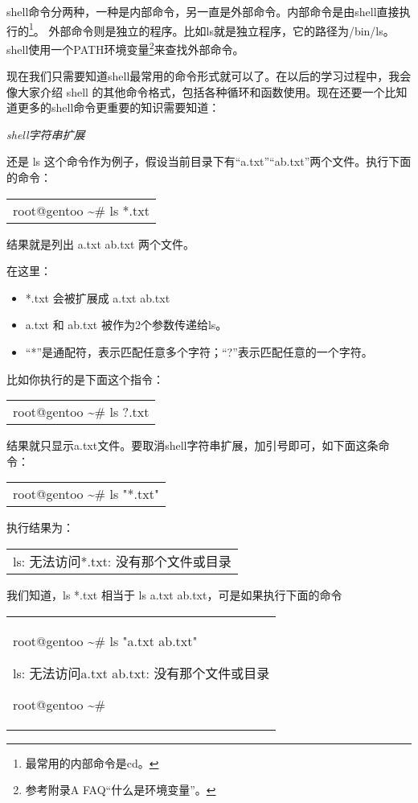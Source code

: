 \documentclass[amstex,twoside]{ctexbook}
\newenvironment{code}{\small\tt\begin{longtable}{p{0.8\textwidth}}}{\end{longtable}}
\begin{document}
shell命令分两种，一种是内部命令，另一直是外部命令。内部命令是由shell直接执行的\footnote{最常用的内部命令是cd。}。
外部命令则是独立的程序。比如ls就是独立程序，它的路径为/bin/ls。shell使用一个PATH环境变量\footnote{参考附录A FAQ“什么是环境变量”。}来查找外部命令。

现在我们只需要知道shell最常用的命令形式就可以了。在以后的学习过程中，我会像大家介绍 shell 的其他命令格式，包括各种循环和函数使用。现在还要一个比知道更多的shell命令更重要的知识需要知道：
\begin{center}\em
shell字符串扩展
\end{center}

还是 ls 这个命令作为例子，假设当前目录下有“a.txt”“ab.txt”两个文件。执行下面的命令：

\begin{code}
root@gentoo \textasciitilde \# ls *.txt
\end{code}

结果就是列出 a.txt ab.txt 两个文件。

在这里：
\begin{itemize}
\item *.txt 会被扩展成 a.txt ab.txt
\item a.txt 和 ab.txt 被作为2个参数传递给ls。
\item “*”是通配符，表示匹配任意多个字符；“?”表示匹配任意的一个字符。
\end{itemize}

比如你执行的是下面这个指令：

\begin{code}
root@gentoo \textasciitilde \# ls ?.txt
\end{code}

结果就只显示a.txt文件。要取消shell字符串扩展，加引号即可，如下面这条命令：

\begin{code}
root@gentoo \textasciitilde \# ls "*.txt"
\end{code}

执行结果为：

\begin{code}
ls: 无法访问*.txt: 没有那个文件或目录
\end{code}


我们知道，ls *.txt 相当于 ls a.txt ab.txt，可是如果执行下面的命令

\begin{code}
root@gentoo \textasciitilde \# ls "a.txt ab.txt" 

ls: 无法访问a.txt ab.txt: 没有那个文件或目录 

root@gentoo \textasciitilde \# 
\end{code}
\end{document}

